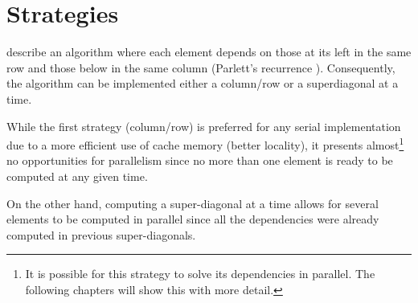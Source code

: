 \documentclass[../thesis]{subfiles}
\begin{document}
	\section{Strategies}
	\label{sec:case:strategy}

	 describe an algorithm where each element depends on those at its left in the same row and those below in the same column (Parlett's recurrence \cite{Parlett:1976}). Consequently, the algorithm can be implemented either a column/row or a superdiagonal at a time.


	While the first strategy (column/row) is preferred for any serial implementation due to a more efficient use of cache memory (better locality), it presents almost\footnote{It is possible for this strategy to solve its dependencies in parallel. The following chapters will show this with more detail.} no opportunities for parallelism since no more than one element is ready to be computed at any given time.

	On the other hand, computing a super-diagonal at a time allows for several elements to be computed in parallel since all the dependencies were already computed in previous super-diagonals.
\end{document}
